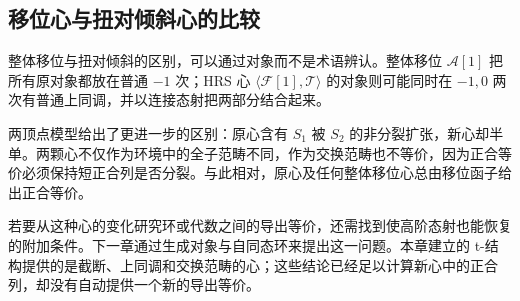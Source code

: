 \subsection{移位心与扭对倾斜心的比较}
\label{b4:subsec:1906:04}

整体移位与扭对倾斜的区别，可以通过对象而不是术语辨认。整体移位 \(\mathcal A[1]\) 把所有原对象都放在普通 \(-1\) 次；HRS 心 \(\langle\mathcal F[1],\mathcal T\rangle\) 的对象则可能同时在 \(-1,0\) 两次有普通上同调，并以连接态射把两部分结合起来。

\ProseParagraphBreak
两顶点模型给出了更进一步的区别：原心含有 \(S_1\) 被 \(S_2\) 的非分裂扩张，新心却半单。两颗心不仅作为环境中的全子范畴不同，作为交换范畴也不等价，因为正合等价必须保持短正合列是否分裂。与此相对，原心及任何整体移位心总由移位函子给出正合等价。

\ProseParagraphBreak
若要从这种心的变化研究环或代数之间的导出等价，还需找到使高阶态射也能恢复的附加条件。下一章通过生成对象与自同态环来提出这一问题。本章建立的 t-结构提供的是截断、上同调和交换范畴的心；这些结论已经足以计算新心中的正合列，却没有自动提供一个新的导出等价。
